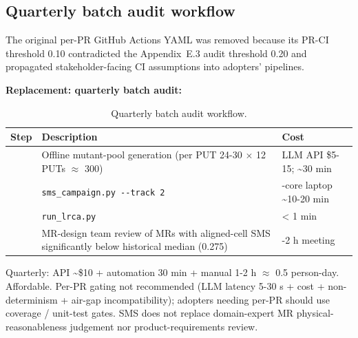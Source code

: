 \documentclass[manuscript,screen,review]{acmart}
\begin{document}
\subsection{Quarterly batch audit workflow}\label{e.2-quarterly-batch-audit-workflow}

The original per-PR GitHub Actions YAML was removed because its PR-CI
threshold 0.10 contradicted the Appendix~E.3 audit threshold 0.20 and propagated
stakeholder-facing CI assumptions into adopters' pipelines.

\textbf{Replacement: quarterly batch audit:}

{%
\begin{longtable}[]{@{}
  >{\raggedright\arraybackslash}p{}
  >{\raggedright\arraybackslash}p{}
  >{\raggedright\arraybackslash}p{}@{}}
\caption{Quarterly batch audit workflow.}\label{tab:p2-26}\\
\toprule\noalign{}
\begin{minipage}[b]{\linewidth}\raggedright
Step
\end{minipage} & \begin{minipage}[b]{\linewidth}\raggedright
Description
\end{minipage} & \begin{minipage}[b]{\linewidth}\raggedright
Cost
\end{minipage} \\
\midrule\noalign{}
\endfirsthead
\endhead
\bottomrule\noalign{}
\endlastfoot
1 & Offline mutant-pool generation (per PUT 24-30 $\times$ 12 PUTs $\approx$ 300) & LLM
API \$5-15; \textasciitilde30 min \\
2 & \texttt{sms\_campaign.py\ -\/-track\ 2} & 4-core laptop
\textasciitilde10-20 min \\
3 & \texttt{run\_lrca.py} & \textless{} 1 min \\
4 & MR-design team review of MRs with aligned-cell SMS significantly
below historical median (0.275) & 1-2 h meeting \\
\end{longtable}
}

Quarterly: API \textasciitilde\$10 + automation 30 min + manual 1-2 h $\approx$
0.5 person-day. Affordable. Per-PR gating not recommended (LLM latency
5-30 s + cost + non-determinism + air-gap incompatibility); adopters
needing per-PR should use coverage / unit-test gates. SMS does not
replace domain-expert MR physical-reasonableness judgement nor
product-requirements review.
\end{document}
